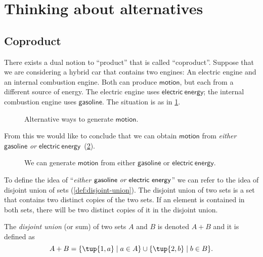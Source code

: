 \section{Thinking about alternatives}
\label{sec:coproductset}
\subsection{Coproduct}

There exists a dual notion to ``product'' that is called ``coproduct''. Suppose that we are considering a hybrid car that contains two engines: An
electric engine and an internal combustion engine. Both can produce $\mathsf{motion}$, but each from a different source of energy. The electric engine uses $\mathsf{electric}\ \mathsf{energy}$; the internal combustion engine uses $\mathsf{gasoline}$. The situation is as in \cref{fig:e16a}.

\begin{figure}[h!]
    \centering
    \caption{Alternative ways to generate $\mathsf{motion}$. \label{fig:e16a}}
\end{figure}

From this we would like to conclude that we can obtain $\mathsf{motion}$ from \emph{either} $\mathsf{gasoline}$ \emph{or}
$\mathsf{electric}\ \mathsf{energy}$~(\cref{fig:e16b}).

\begin{figure}[h!]
    \centering
    \caption{We can generate $\mathsf{motion}$ from either $\mathsf{gasoline}$ or $\mathsf{electric} \ \mathsf{energy}$. \label{fig:e16b}}
\end{figure}

To define the idea of ``\emph{either $\mathsf{gasoline}\ \emph{or} \ \mathsf{electric}\ \mathsf{energy}$}'' we can
refer to the idea of disjoint union of sets (\cref{def:disjoint-union}). The
disjoint union of two sets is a set that contains two distinct copies of the two sets. If an element is contained in both sets, there will be two distinct copies of it in the disjoint union.

\begin{definition}
\label{def:disjoint-union}
    The \emph{disjoint union} (or sum) of two sets $A$ and $B$ is denoted $A + B$
    and it is defined as
    \begin{equation}
        A + B=\{\tup{1,a}\mid a\in A\}\cup\{\tup{2,b}\mid b\in B\}.
    \end{equation}
\end{definition}

